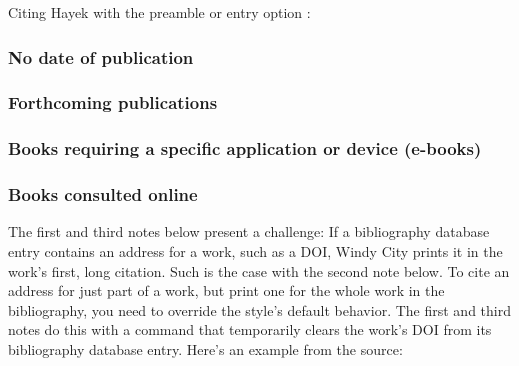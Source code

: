 \documentclass[11pt,letterpaper,oneside]{article}
\begin{document}
\noindent Citing Hayek with the preamble or entry option
:

\begin{citebib}
\item \cite*[329]{hayek2011}
\end{citebib}

\subsubsection{No date of publication}

\begin{citebib}
\item \cite{boston}
\item \cite{edinburgh1750}
\item \cite{edinburgh}
\end{citebib}

\subsubsection{Forthcoming publications}

\begin{citebib}
\item \cite{author}
\item \cite[345--46]{writer}
\item \cite{contributor}
\end{citebib}

\setcounter{subsubsection}{158}
\subsubsection{Books requiring a specific application or device (e-books)}

\begin{citebib}
\item \cite{borel2015}
\end{citebib}

\setcounter{subsubsection}{160}
\subsubsection{Books consulted online}

The first and third notes below present a challenge: If a bibliography
database entry contains an address for a work, such as a DOI, Windy
City prints it in the work's first, long citation. Such is the case
with the second note below. To cite an address for just part of a
work, but print one for the whole work in the bibliography, you need
to override the style's default behavior. The first and third notes do
this with a command that temporarily clears the work's DOI from its
bibliography database entry. Here's an example from the source:
\end{document}
